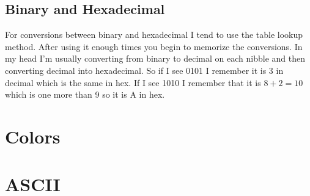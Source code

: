 \subsection{Binary and Hexadecimal}
For conversions between binary and hexadecimal I tend to use the table lookup method. After using it 
enough times you begin to memorize the conversions. In my head I'm usually converting from binary to 
decimal on each nibble and then converting decimal into hexadecimal. So if I see 0101 I remember it 
is 3 in decimal which is the same in hex. If I see 1010 I remember that it is $8 + 2 = 10$ which is 
one more than 9 so it is A in hex.

\section{Colors}
\section{ASCII}